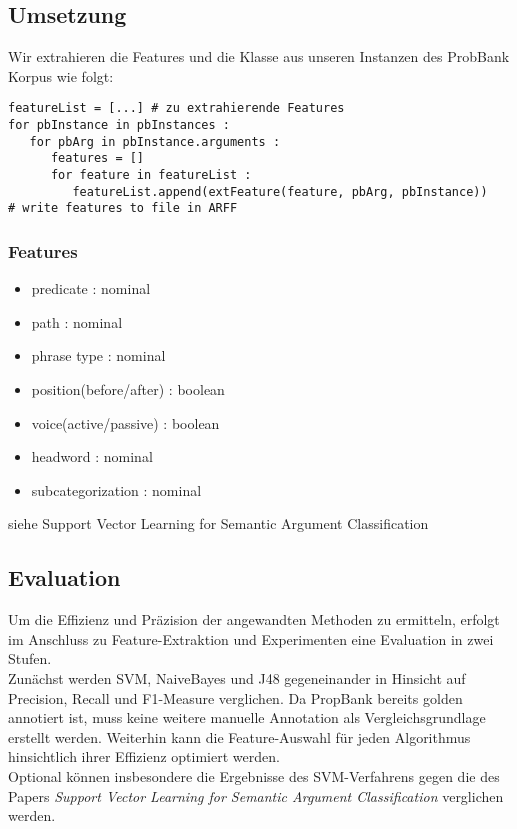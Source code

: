 \documentclass[runningheads]{llncs}
\begin{document}
\subsection{Umsetzung}

Wir extrahieren die Features und die Klasse aus unseren Instanzen des ProbBank Korpus wie folgt:
\begin{lstlisting}[frame=lines]
featureList = [...] # zu extrahierende Features
for pbInstance in pbInstances :
   for pbArg in pbInstance.arguments :
      features = []
      for feature in featureList :
         featureList.append(extFeature(feature, pbArg, pbInstance))
# write features to file in ARFF
\end{lstlisting}

\subsubsection{Features}
\begin{itemize}
\item predicate : nominal
\item path : nominal
\item phrase type : nominal
\item position(before/after) : boolean
\item voice(active/passive) : boolean
\item headword : nominal
\item subcategorization : nominal
\end{itemize}
siehe Support Vector Learning for Semantic Argument Classiﬁcation\cite{svm}

\subsection{Evaluation}
Um die Effizienz und Pr\"azision der angewandten Methoden zu ermitteln, erfolgt im Anschluss zu Feature-Extraktion und Experimenten eine Evaluation in zwei Stufen.\\
Zun\"achst werden SVM, NaiveBayes und J48 gegeneinander in Hinsicht auf Precision, Recall und F1-Measure verglichen. Da PropBank bereits golden annotiert ist, muss keine weitere manuelle Annotation als Vergleichsgrundlage erstellt werden. Weiterhin kann die Feature-Auswahl f\"ur jeden Algorithmus hinsichtlich ihrer Effizienz optimiert werden.\\
Optional k\"onnen insbesondere die Ergebnisse des SVM-Verfahrens gegen die des Papers \textit{Support Vector Learning for Semantic Argument Classiﬁcation}\cite{svm} verglichen werden.
\end{document}
